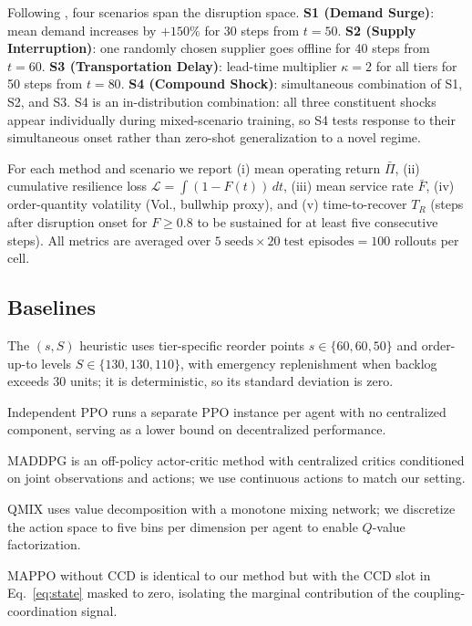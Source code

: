 \documentclass[11pt,a4paper]{article}
\theoremstyle{plain}
\theoremstyle{definition}
\begin{document}
Following \citet{hosseini2019review}, four scenarios span the disruption space.
\textbf{S1 (Demand Surge)}: mean demand increases by $+150\%$ for 30 steps from $t=50$.
\textbf{S2 (Supply Interruption)}: one randomly chosen supplier goes offline for 40 steps
from $t=60$.
\textbf{S3 (Transportation Delay)}: lead-time multiplier $\kappa=2$ for all tiers for
50 steps from $t=80$.
\textbf{S4 (Compound Shock)}: simultaneous combination of S1, S2, and S3.  S4 is an
in-distribution combination: all three constituent shocks appear individually during
mixed-scenario training, so S4 tests response to their simultaneous onset rather than
zero-shot generalization to a novel regime.

For each method and scenario we report (i) mean operating return $\bar\Pi$, (ii)
cumulative resilience loss $\mathcal{L}=\int(1-F(t))\,dt$, (iii) mean service rate
$\bar F$, (iv) order-quantity volatility (Vol., bullwhip proxy), and (v) time-to-recover
$T_R$ (steps after disruption onset for $F\ge0.8$ to be sustained for at least five
consecutive steps).  All metrics are averaged over $5\;\text{seeds}\times20\;\text{test
episodes}=100$ rollouts per cell.

\subsection{Baselines}
\label{sec:baselines}

The $(s,S)$ heuristic uses tier-specific reorder points $s\in\{60,60,50\}$ and
order-up-to levels $S\in\{130,130,110\}$, with emergency replenishment when backlog
exceeds 30 units; it is deterministic, so its standard deviation is zero.

Independent PPO \citep{papoudakis2021benchmarking} runs a separate PPO instance per
agent with no centralized component, serving as a lower bound on decentralized
performance.

MADDPG \citep{lowe2017multi} is an off-policy actor-critic method with centralized
critics conditioned on joint observations and actions; we use continuous actions to
match our setting.

QMIX \citep{rashid2018qmix} uses value decomposition with a monotone mixing network;
we discretize the action space to five bins per dimension per agent to enable
$Q$-value factorization.

MAPPO without CCD is identical to our method but with the CCD slot in
Eq.~\eqref{eq:state} masked to zero, isolating the marginal contribution of the
coupling-coordination signal.
\end{document}
